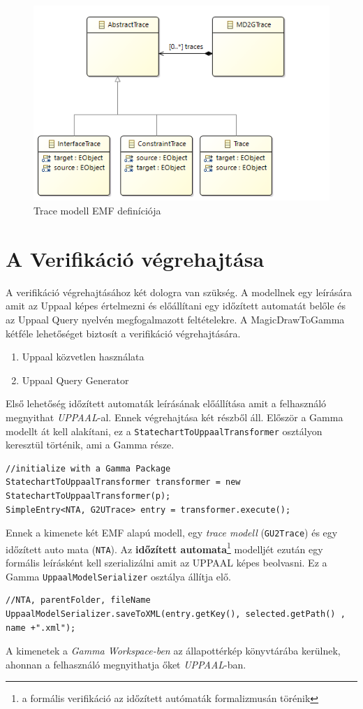 \begin{figure}[ht]
	\centering
	\includegraphics[keepaspectratio, width=140mm]{figures/trace-model.png}
	\caption{Trace modell EMF definíciója}
	\label{fig:trace-model}
\end{figure}


\section{A Verifikáció végrehajtása}
A verifikáció végrehajtásához két dologra van szükség. A modellnek egy leírására amit az Uppaal képes értelmezni és előállítani egy időzített automatát belőle és az Uppaal Query nyelvén megfogalmazott feltételekre. A MagicDrawToGamma kétféle lehetőséget biztosít a verifikáció végrehajtására.

\begin{enumerate}
	\item Uppaal közvetlen használata
	\item Uppaal Query Generator
	\label{en:fels}
\end{enumerate}

Első lehetőség időzített automaták leírásának előállítása amit a felhasználó megnyithat \emph{UPPAAL}-al. Ennek végrehajtása két részből áll. Először a Gamma modellt át kell alakítani, ez a \verb+StatechartToUppaalTransformer+ osztályon keresztül történik, ami a Gamma része.
\begin{lstlisting}
//initialize with a Gamma Package
StatechartToUppaalTransformer transformer = new StatechartToUppaalTransformer(p);
SimpleEntry<NTA, G2UTrace> entry = transformer.execute();
\end{lstlisting}
Ennek a kimenete két EMF alapú modell, egy \emph{trace modell} (\verb+GU2Trace+) és egy időzített auto
mata (\verb+NTA+). Az \textbf{időzített automata}\footnote{a formális verifikáció az időzített autómaták formalizmusán törénik} modelljét ezután egy formális leírásként kell szerializálni amit az UPPAAL képes beolvasni. Ez a Gamma \verb+UppaalModelSerializer+ osztálya állítja elő. 
\begin{lstlisting}
//NTA, parentFolder, fileName
UppaalModelSerializer.saveToXML(entry.getKey(), selected.getPath() , name +".xml");
\end{lstlisting}
A kimenetek a \emph{Gamma Workspace-ben} az állapottérkép könyvtárába kerülnek, ahonnan a felhasználó megnyithatja őket \emph{UPPAAL}-ban.


